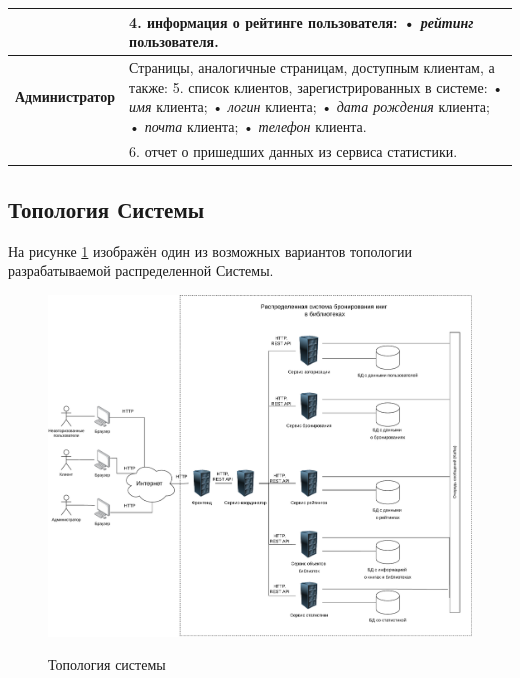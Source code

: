\documentclass[a4paper, 12pt]{article}
\begin{document}
\begin{large}
\begin{longtable}{|p{0.5cm}|p{15.5cm}|}
	&
	4. информация о рейтинге пользователя: \newline
	• \textit{рейтинг} пользователя. \\
	\hline
	
	\begin{rotatebox}[origin=r]{90}
		{ \textbf{Администратор}}
	\end{rotatebox} 
	& 
    Страницы, аналогичные страницам, доступным клиентам, а также:
	5. список клиентов, зарегистрированных в системе: \newline
	• \textit{имя} клиента; \newline
	• \textit{логин} клиента; \newline
    • \textit{дата рождения} клиента; \newline
	• \textit{почта} клиента; \newline
	• \textit{телефон} клиента. \\
    \cline{2-2}
	
	&
	6. отчет о пришедших данных из сервиса статистики. \\
	\hline
\end{longtable}

\subsection{Топология Системы}
На рисунке \ref{fig:topology} изображён один из возможных вариантов  топологии разрабатываемой распределенной Системы.
\begin{figure}[h]
	\begin{center}
		{\includegraphics[scale = 0.5]{img/topology.pdf}}
		\caption{Топология системы}
		\label{fig:topology}
	\end{center}
\end{figure}


\end{large}
\end{document}

